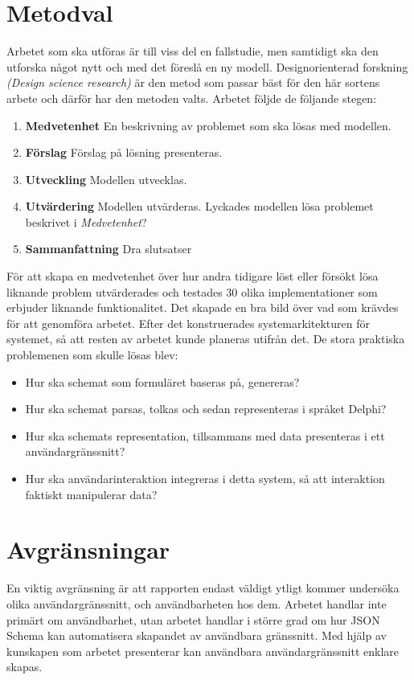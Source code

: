 \section{Metodval}
\label{sec:intro:metodval}
Arbetet som ska utföras är till viss del en fallstudie, men samtidigt ska den utforska något nytt och med det föreslå en ny modell. Designorienterad forskning \textit{(Design science research)} är den metod som passar bäst för den här sortens arbete och därför har den metoden valts.
\noindent
Arbetet följde de följande stegen:

\begin{enumerate}
	\item \textbf{Medvetenhet} En beskrivning av problemet som ska lösas med modellen.
	\item \textbf{Förslag} Förslag på lösning presenteras.
	\item \textbf{Utveckling} Modellen utvecklas.
	\item \textbf{Utvärdering} Modellen utvärderas. Lyckades modellen lösa problemet beskrivet i \textit{Medvetenhet}?
	\item \textbf{Sammanfattning} Dra slutsatser
\end{enumerate}

\noindent
För att skapa en medvetenhet över hur andra tidigare löst eller försökt lösa liknande problem utvärderades och testades 30 olika implementationer som erbjuder liknande funktionalitet. Det skapade en bra bild över vad som krävdes för att genomföra arbetet. Efter det konstruerades systemarkitekturen för systemet, så att resten av arbetet kunde planeras utifrån det. De stora praktiska problemenen som skulle lösas blev:

\begin{itemize}
	\item Hur ska schemat som formuläret baseras på, genereras?
	\item Hur ska schemat parsas, tolkas och sedan representeras i språket Delphi?
	\item Hur ska schemats representation, tillsammans med data presenteras i ett användargränssnitt?
	\item Hur ska användarinteraktion integreras i detta system, så att interaktion faktiskt manipulerar data?
\end{itemize}

\section{Avgränsningar}
\label{sec:intro:avgränsningar}
En viktig avgränsning är att rapporten endast väldigt ytligt kommer undersöka olika användargränssnitt, och användbarheten hos dem. Arbetet handlar inte primärt om användbarhet, utan arbetet handlar i större grad om hur JSON Schema kan automatisera skapandet av användbara gränssnitt. Med hjälp av kunskapen som arbetet presenterar kan användbara användargränssnitt enklare skapas.

